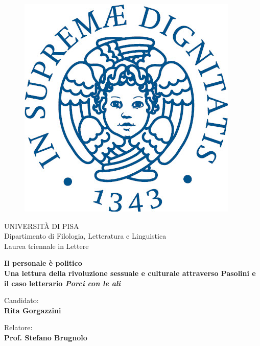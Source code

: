 \begin{titlepage}
\begin{figure}[!htb]
    \centering
    \includegraphics[keepaspectratio=true,scale=0.5]{Immagini/cherubinFrontespizio.jpeg}
\end{figure}

\begin{center}
    \LARGE{UNIVERSITÀ DI PISA}
    \vspace{5mm}
    \\ \large{Dipartimento di Filologia, Letteratura e Linguistica}
    \vspace{5mm}
    \\ \LARGE{Laurea triennale in Lettere}
\end{center}

\vspace{15mm}
\begin{center}
    {{\LARGE{\bf Il personale è politico}}
    {\large{\bf \vspace{2,5mm}\\Una lettura della rivoluzione sessuale e culturale attraverso Pasolini e il caso letterario \textit{Porci con le ali}}}}
    
    
\end{center}
\vspace{30mm}

\begin{minipage}[t]{0.47\textwidth}
	{\large{Candidato:}{\normalsize\vspace{3mm}
	\bf\\ \large{Rita Gorgazzini} \normalsize\vspace{3mm}\bf}}
\end{minipage}
\hfill
\begin{minipage}[t]{0.47\textwidth}\raggedright
	{\large {Relatore:}{\normalsize\vspace{3mm} \bf\\ \large{Prof. Stefano Brugnolo}}}
\end{minipage}

\vspace{30mm}
\hrulefill
\\

\end{titlepage}